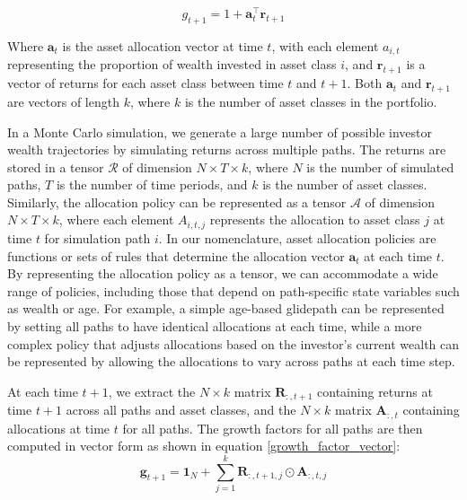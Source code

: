 \documentclass[11pt]{article}
\begin{document}
\begin{equation}\label{growth_factor}
g_{t+1} = 1 + \mathbf{a}_t^\top \mathbf{r}_{t+1}
\end{equation}

Where \(\mathbf{a}_t\) is the asset allocation vector at time \(t\), with each element \(a_{i,t}\) representing the proportion of wealth invested in asset class \(i\), and \(\mathbf{r}_{t+1}\) is a vector of returns for each asset class between time \(t\) and \(t+1\). Both \(\mathbf{a}_t\) and \(\mathbf{r}_{t+1}\) are vectors of length \(k\), where \(k\) is the number of asset classes in the portfolio.

In a Monte Carlo simulation, we generate a large number of possible investor wealth trajectories by simulating returns across multiple paths. The returns are stored in a tensor \(\mathcal{R}\) of dimension \(N \times T \times k\), where \(N\) is the number of simulated paths, \(T\) is the number of time periods, and \(k\) is the number of asset classes. Similarly, the allocation policy can be represented as a tensor \(\mathcal{A}\) of dimension \(N \times T \times k\), where each element \(A_{i,t,j}\) represents the allocation to asset class \(j\) at time \(t\) for simulation path \(i\). In our nomenclature, asset allocation policies are functions or sets of rules that determine the allocation vector \(\mathbf{a}_t\) at each time \(t\). By representing the allocation policy as a tensor, we can accommodate a wide range of policies, including those that depend on path-specific state variables such as wealth or age. For example, a simple age-based glidepath can be represented by setting all paths to have identical allocations at each time, while a more complex policy that adjusts allocations based on the investor's current wealth can be represented by allowing the allocations to vary across paths at each time step.

At each time \(t+1\), we extract the \(N \times k\) matrix \(\mathbf{R}_{:,t+1}\) containing returns at time \(t+1\) across all paths and asset classes, and the \(N \times k\) matrix \(\mathbf{A}_{:,t}\) containing allocations at time \(t\) for all paths. The growth factors for all paths are then computed in vector form as shown in equation \ref{growth_factor_vector}:
\begin{equation}\label{growth_factor_vector}
\mathbf{g}_{t+1} = \mathbf{1}_N + \sum_{j=1}^{k} \mathbf{R}_{:,t+1,j} \odot \mathbf{A}_{:,t,j}
\end{equation}
\end{document}
